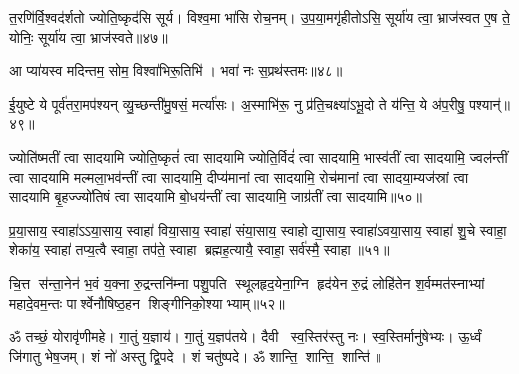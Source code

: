त॒रणि॑र्वि॒श्वद॑र्\mbox{}शतो ज्योति॒ष्कृद॑सि सूर्य। विश्व॒मा भा॑सि रोच॒नम्। उ॒प॒या॒मगृ॑हीतोऽसि॒ सूर्या॑य त्वा॒ भ्राज॑स्वत ए॒ष ते॒ योनिः॒ सूर्या॑य त्वा॒ भ्राज॑स्वते॥४७॥
\anuvakamend

आ प्या॑यस्व मदिन्तम॒ सोम॒ विश्वा॑भिरू॒तिभि॑। भवा॑ नः स॒प्रथ॑स्तमः॥४८॥
\anuvakamend

ई॒युष्टे ये पूर्व॑तरा॒मप॑श्यन् व्यु॒च्छन्ती॑मु॒षसं॒ मर्त्या॑सः। अ॒स्माभि॑रू॒ नु प्र॑ति॒चक्ष्या॑ऽभू॒दो ते य॑न्ति॒ ये अ॑प॒रीषु॒ पश्यान्॑॥४९॥
\anuvakamend

ज्योति॑ष्मतीं त्वा सादयामि ज्योति॒ष्कृतं॑ त्वा सादयामि ज्योति॒र्विदं॑ त्वा सादयामि॒ भास्व॑तीं त्वा सादयामि॒ ज्वल॑न्तीं त्वा सादयामि मल्मला॒भव॑न्तीं त्वा सादयामि॒ दीप्य॑मानां त्वा सादयामि॒ रोच॑मानां त्वा सादया॒म्यज॑स्रां त्वा सादयामि बृ॒हज्ज्यो॑तिषं त्वा सादयामि बो॒धय॑न्तीं त्वा सादयामि॒ जाग्र॑तीं त्वा सादयामि॥५०॥
\anuvakamend

प्र॒या॒साय॒ स्वाहा॑ऽऽया॒साय॒ स्वाहा॑ विया॒साय॒ स्वाहा॑ संया॒साय॒ स्वाहोद्या॒साय॒ स्वाहा॑ऽवया॒साय॒ स्वाहा॑ शु॒चे स्वाहा॒ शेका॑य॒ स्वाहा॑ तप्य॒त्वै स्वाहा॒ तप॑ते॒ स्वाहा ब्रह्मह॒त्यायै॒ स्वाहा॒ सर्व॑स्मै॒ स्वाहा॥५१॥
\anuvakamend

चि॒त्त स॑न्ता॒नेन॑ भ॒वं य॒क्ना रु॒द्रन्तनि॑म्ना पशु॒पति स्थूलहृद॒येना॒ग्नि हृद॑येन रु॒द्रं लोहि॑तेन श॒र्वम्मत॑स्नाभ्यां महादे॒वम॒न्तः पार्श्वेनौषिष्ठ॒हन शिङ्गीनिको॒श्याभ्याम्॥५२॥
\anuvakamend

ॐ तच्छं॒ योरावृ॑णीमहे। गा॒तुं य॒ज्ञाय॑। गा॒तुं य॒ज्ञप॑तये। 
दैवी स्व॒स्तिर॑स्तु नः। स्व॒स्तिर्मानु॑षेभ्यः। ऊ॒र्ध्वं जि॑गातु भेष॒जम्। 
शं नो॑ अस्तु द्वि॒पदे। शं चतु॑ष्पदे। ॐ शान्ति॒ शान्ति॒ शान्ति॑॥

\closesection
\clearpage